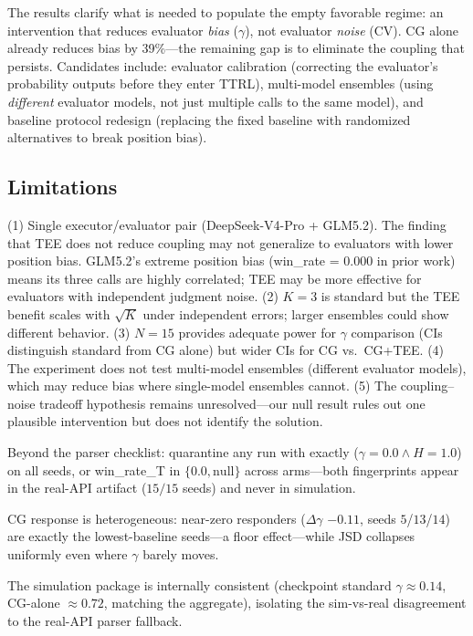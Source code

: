 \documentclass[11pt]{article}
\begin{document}
The results clarify what is needed to populate the empty favorable regime: an intervention that reduces evaluator \textit{bias} ($\gamma$), not evaluator \textit{noise} (CV). CG alone already reduces bias by 39\%---the remaining gap is to eliminate the coupling that persists. Candidates include: evaluator calibration (correcting the evaluator's probability outputs before they enter TTRL), multi-model ensembles (using \textit{different} evaluator models, not just multiple calls to the same model), and baseline protocol redesign (replacing the fixed baseline with randomized alternatives to break position bias).

\subsection{Limitations}

(1) Single executor/evaluator pair (DeepSeek-V4-Pro + GLM5.2). The finding that TEE does not reduce coupling may not generalize to evaluators with lower position bias. GLM5.2's extreme position bias (win\_rate = 0.000 in prior work) means its three calls are highly correlated; TEE may be more effective for evaluators with independent judgment noise. (2) $K{=}3$ is standard but the TEE benefit scales with $\sqrt{K}$ under independent errors; larger ensembles could show different behavior. (3) $N{=}15$ provides adequate power for $\gamma$ comparison (CIs distinguish standard from CG alone) but wider CIs for CG vs.\ CG+TEE. (4) The experiment does not test multi-model ensembles (different evaluator models), which may reduce bias where single-model ensembles cannot. (5) The coupling--noise tradeoff hypothesis remains unresolved---our null result rules out one plausible intervention but does not identify the solution.

Beyond the parser checklist: quarantine any run with exactly ($\gamma=0.0 \land H=1.0$) on all seeds, or win\_rate\_T in $\{0.0, \mathrm{null}\}$ across arms---both fingerprints appear in the real-API artifact ($15/15$ seeds) and never in simulation.

CG response is heterogeneous: near-zero responders ($\Delta\gamma$ $-0.11$, seeds $5$/$13$/$14$) are exactly the lowest-baseline seeds---a floor effect---while JSD collapses uniformly even where $\gamma$ barely moves.

The simulation package is internally consistent (checkpoint standard $\gamma\approx0.14$, CG-alone $\approx0.72$, matching the aggregate), isolating the sim-vs-real disagreement to the real-API parser fallback.
\end{document}
